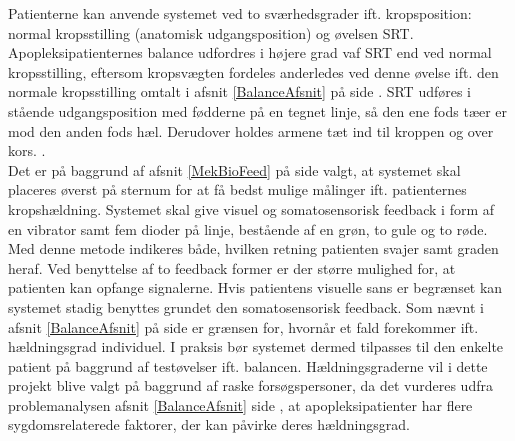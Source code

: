 Patienterne kan anvende systemet ved to sværhedsgrader ift. kropsposition: normal kropsstilling (anatomisk udgangsposition) og øvelsen SRT. Apopleksipatienternes balance udfordres i højere grad vaf SRT end ved normal kropsstilling, eftersom kropsvægten fordeles anderledes ved denne øvelse ift. den normale kropsstilling omtalt i afsnit \ref{BalanceAfsnit} på side \pageref{BalanceAfsnit}. SRT udføres i stående udgangsposition med fødderne på en tegnet linje, så den ene fods tæer er mod den anden fods hæl. Derudover holdes armene tæt ind til kroppen og over kors. \cite{Huo1999}.\\ %
Det er på baggrund af afsnit \ref{MekBioFeed} på side \pageref{MekBioFeed} valgt, at systemet skal placeres øverst på sternum for at få bedst mulige målinger ift. patienternes kropshældning. Systemet skal give visuel og somatosensorisk feedback i form af en vibrator samt fem dioder på linje, bestående af en grøn, to gule og to røde. Med denne metode indikeres både, hvilken retning patienten svajer samt graden heraf. Ved benyttelse af to feedback former er der større mulighed for, at patienten kan opfange signalerne. Hvis patientens visuelle sans er begrænset kan systemet stadig benyttes grundet den somatosensorisk feedback. Som nævnt i afsnit \ref{BalanceAfsnit} på side \pageref{BalanceAfsnit} er grænsen for, hvornår et fald forekommer ift. hældningsgrad individuel. I praksis bør systemet dermed tilpasses til den enkelte patient på baggrund af testøvelser ift. balancen. Hældningsgraderne vil i dette projekt blive valgt på baggrund af raske forsøgspersoner, da det vurderes udfra problemanalysen afsnit \ref{BalanceAfsnit} side \pageref{BalanceAfsnit}, at apopleksipatienter har flere sygdomsrelaterede faktorer, der kan påvirke deres hældningsgrad. 


